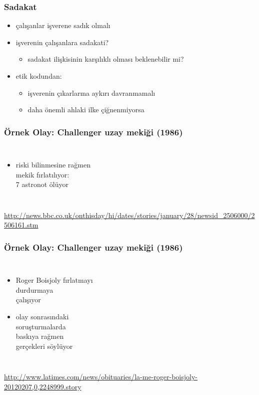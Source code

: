 \documentclass[dvipsnames]{beamer}
\theoremstyle{definition}
\theoremstyle{example}
\theoremstyle{plain}
\begin{document}
\begin{frame}
  \frametitle{Sadakat}

  \begin{itemize}
    \item çalışanlar işverene sadık olmalı

    \medskip
    \item işverenin çalışanlara sadakati?
    \begin{itemize}
      \item sadakat ilişkisinin karşılıklı olması beklenebilir mi?
    \end{itemize}

    \pause
    \medskip
    \item etik kodundan:
    \begin{itemize}
      \item işverenin çıkarlarına aykırı davranmamalı
      \item daha önemli ahlaki ilke çiğnenmiyorsa
    \end{itemize}
  \end{itemize}
\end{frame}

\begin{frame}
  \frametitle{Örnek Olay: Challenger uzay mekiği (1986)}

  \begin{columns}

    \begin{itemize}
      \item riski bilinmesine rağmen\\
        mekik fırlatılıyor:\\
        7 astronot ölüyor
    \end{itemize}
  \end{columns}

  \medskip
  \tiny{\url{http://news.bbc.co.uk/onthisday/hi/dates/stories/january/28/newsid_2506000/2506161.stm}}
\end{frame}

\begin{frame}
  \frametitle{Örnek Olay: Challenger uzay mekiği (1986)}

  \begin{columns}

    \begin{itemize}
      \item Roger Boisjoly fırlatmayı\\
        durdurmaya\\
        çalışıyor
      \item olay sonrasındaki\\
        soruşturmalarda\\
        baskıya rağmen\\
        gerçekleri söylüyor
    \end{itemize}
  \end{columns}

  \medskip
  \tiny{\url{http://www.latimes.com/news/obituaries/la-me-roger-boisjoly-20120207,0,2248999.story}}
\end{frame}
\end{document}
